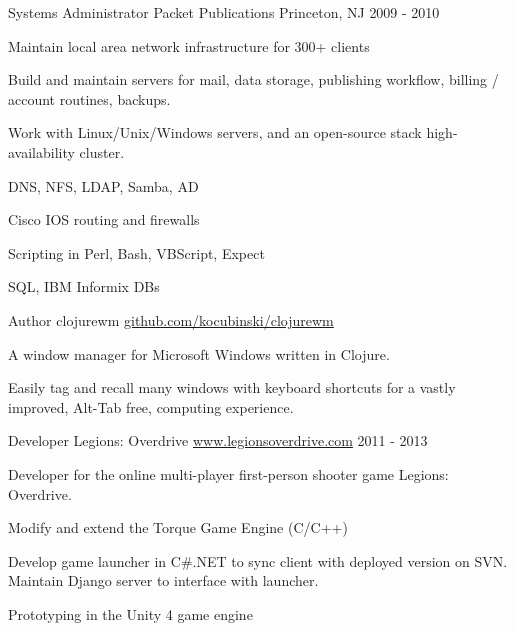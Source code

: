 \documentclass[11pt, letterpaper]{awesome-cv}
\begin{document}
\begin{cventries}
  \cventry
    {Systems Administrator} %
    {Packet Publications} %
    {Princeton, NJ} %
    {2009 - 2010} %
    {
      \begin{cvitems} %
        \item {Maintain local area network infrastructure for 300+ clients}
        \item {Build and maintain servers for mail, data storage, publishing workflow, billing / account routines, backups.}
        \item {Work with Linux/Unix/Windows servers, and an open-source stack high-availability cluster.}
        \item {DNS, NFS, LDAP, Samba, AD}
        \item {Cisco IOS routing and firewalls}
        \item {Scripting in Perl, Bash, VBScript, Expect}
        \item {SQL, IBM Informix DBs}
      \end{cvitems}
    }

\end{cventries}

\begin{cventries}
  \cventry
    {Author}
    {clojurewm}
    {\href{https://github.com/kocubinski/clojurewm}{github.com/kocubinski/clojurewm}}
    {}
    {
      \begin{cvitems}
        \item {A window manager for Microsoft Windows written in Clojure.}
        \item {Easily tag and recall many windows with keyboard shortcuts for a vastly improved, Alt-Tab free, computing experience.}
      \end{cvitems}
    }
\end{cventries}

\begin{cventries}
  \cventry
    {Developer}
    {Legions: Overdrive}
    {\href{http://www.legionsoverdrive.com}{www.legionsoverdrive.com}}
    {2011 - 2013}
    {
      \begin{cvitems}
        \item {Developer for the online multi-player first-person shooter game Legions: Overdrive.}
        \item {Modify and extend the Torque Game Engine (C/C++)}
        \item {Develop game launcher in C\#.NET to sync client with deployed version on SVN.  Maintain Django server to interface with launcher.}
        \item {Prototyping in the Unity 4 game engine}
      \end{cvitems}
    }
\end{cventries}
\end{document}
